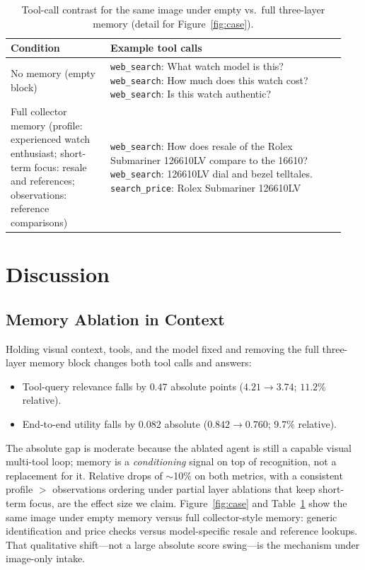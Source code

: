 \documentclass[11pt,a4paper]{article}
\begin{document}
\begin{table}[t]
\centering
\caption{Tool-call contrast for the same image under empty vs.\ full three-layer memory (detail for Figure~\ref{fig:case}).}
\label{tab:case}
\begin{tabular}{p{0.28\linewidth}p{0.66\linewidth}}
\toprule
\textbf{Condition} & \textbf{Example tool calls} \\
\midrule
No memory
(empty block)
& \texttt{web\_search}: What watch model is this? \texttt{web\_search}: How much does this watch cost? \texttt{web\_search}: Is this watch authentic? \\
\addlinespace
Full collector memory
(profile: experienced watch enthusiast; short-term focus: resale and references; observations: reference comparisons)
& \texttt{web\_search}: How does resale of the Rolex Submariner 126610LV compare to the 16610? \texttt{web\_search}: 126610LV dial and bezel telltales. \texttt{search\_price}: Rolex Submariner 126610LV \\
\bottomrule
\end{tabular}
\end{table}

\section{Discussion}

\subsection{Memory Ablation in Context}

Holding visual context, tools, and the model fixed and removing the full three-layer memory block changes both tool calls and answers:
\begin{itemize}[leftmargin=*]
    \item Tool-query relevance falls by $0.47$ absolute points ($4.21\!\to\!3.74$; $11.2\%$ relative).
    \item End-to-end utility falls by $0.082$ absolute ($0.842\!\to\!0.760$; $9.7\%$ relative).
\end{itemize}
The absolute gap is moderate because the ablated agent is still a capable visual multi-tool loop; memory is a \emph{conditioning} signal on top of recognition, not a replacement for it. Relative drops of $\sim$10\% on both metrics, with a consistent profile $>$ observations ordering under partial layer ablations that keep short-term focus, are the effect size we claim. Figure~\ref{fig:case} and Table~\ref{tab:case} show the same image under empty memory versus full collector-style memory: generic identification and price checks versus model-specific resale and reference lookups. That qualitative shift---not a large absolute score swing---is the mechanism under image-only intake.
\end{document}
